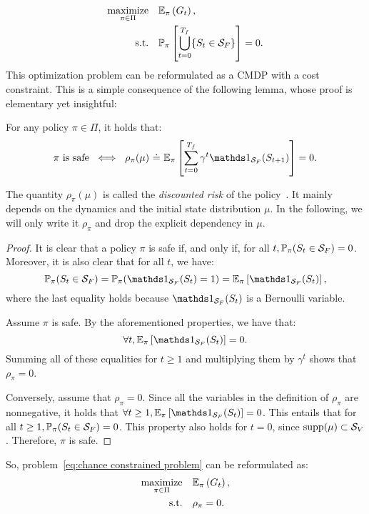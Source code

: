 \begin{equation}
	\begin{aligned}
		\underset{\pi\in\Pi}{\text{maximize}} & \quad\mathbb{E}_\pi\left(G_t\right),\\
		\text{s.t.} & \quad \mathbb{P}_\pi\left[\bigcup_{t=0}^{{T_f}}\{S_t\in{\ensuremath{\mathcal{S}}_{F}}\}\right] = 0.
	\end{aligned} \label{eq:chance constrained problem}
\end{equation}
This optimization problem can be reformulated as a CMDP with a cost constraint. This is a simple consequence of the following lemma, whose proof is elementary yet insightful:
\begin{lemma}
	For any policy $\pi\in\Pi$, it holds that:
	\begin{equation}
		\pi~\text{is safe}~\iff~\rho_\pi(\mu)~\eqdef~\expected_\pi\left[\sum_{t=0}^\Tf\gamma^t\indicator_\SF(S_{t+1})\right] = 0.
	\end{equation}
\end{lemma}
The quantity $\rho_\pi(\mu)$ is called the\emph{ discounted risk} of the policy~\cite{geibel2005risk}. It mainly depends on the dynamics and the initial state distribution $\mu$. In the following, we will only write it $\rho_\pi$ and drop the explicit dependency in $\mu$.
\begin{proof}
	It is clear that a policy $\pi$ is safe if, and only if, for all $t, \mathbb{P}_\pi(S_t \in{\ensuremath{\mathcal{S}}_{F}}) = 0$. Moreover, it is also clear that for all $t$, we have: $$ \P_\pi(S_t\in\SF) = \P_\pi(\indicator_\SF(S_t) = 1) =  \expected_\pi\left[\indicator_\SF(S_t)\right],$$ where the last equality holds because $\indicator_\SF(S_t)$ is a Bernoulli variable.\par
	Assume $\pi$ is safe. By the aforementioned properties, we have that:$$\forall t, \expected_\pi\left[\indicator_\SF(S_t)\right] = 0.$$ Summing all of these equalities for $t\geq1$ and multiplying them by $\gamma^t$ shows that $\rho_\pi = 0$.\par
	Conversely, assume that $\rho_\pi = 0$. Since all the variables in the definition of $\rho_\pi$ are nonnegative, it holds that $\forall t \geq 1, \expected_\pi\left[\indicator_\SF(S_t)\right] = 0$. This entails that for all $t\geq 1,  \mathbb{P}_\pi(S_t \in{\ensuremath{\mathcal{S}}_{F}}) = 0$. This property also holds for $t=0$, since $\operatorname{supp}(\mu)\subset{\ensuremath{\mathcal{S}}_{V}}$. Therefore, $\pi$ is safe.
\end{proof}
So, problem~\eqref{eq:chance constrained problem} can be reformulated as:
\begin{align}
		\underset{\pi\in\Pi}{\text{maximize}} & \quad\mathbb{E}_\pi\left(G_t\right), \label{eq:cost constrained problem objective}\\
		\text{s.t.} & \quad \rho_\pi = 0. \label{eq:cost constrained problem constraint}
\end{align}
